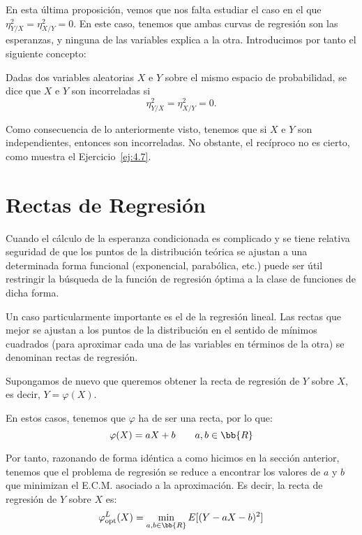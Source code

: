 En esta última proposición, vemos que nos falta estudiar el caso en el que $\eta_{Y/X}^2 = \eta_{X/Y}^2 = 0$. En este caso, tenemos que ambas curvas de regresión son las esperanzas, y ninguna de las variables explica a la otra. Introducimos por tanto el siguiente concepto:
\begin{definicion}[Incorrelación]
    Dadas dos variables aleatorias $X$ e $Y$ sobre el mismo espacio de probabilidad, se dice que $X$ e $Y$ son incorreladas si $$\eta_{Y/X}^2 = \eta_{X/Y}^2 = 0.$$
\end{definicion}

Como consecuencia de lo anteriormente visto, tenemos que si $X$ e $Y$ son independientes, entonces son incorreladas. No obstante, el recíproco no es cierto, como muestra el Ejercicio~\ref{ej:4.7}.


\section{Rectas de Regresión}

Cuando el cálculo de la esperanza condicionada es complicado y se tiene relativa seguridad de que los puntos de la distribución teórica se ajustan a una determinada forma funcional (exponencial, parabólica, etc.) puede ser útil restringir la búsqueda de la función de regresión óptima a la clase de funciones de dicha forma.

Un caso particularmente importante es el de la regresión lineal. Las rectas que mejor se ajustan a los puntos de la distribución en el sentido de mínimos cuadrados (para aproximar cada una de las variables en términos de la otra) se denominan rectas de regresión.

\begin{observacion}
    Supongamos de nuevo que queremos obtener la recta de regresión de $Y$ sobre $X$, es decir, $Y=\varphi(X)$.
\end{observacion}

En estos casos, tenemos que $\varphi$ ha de ser una recta, por lo que:
\begin{equation*}
    \varphi(X) = aX + b\qquad a,b\in\bb{R}
\end{equation*}

Por tanto, razonando de forma idéntica a como hicimos en la sección anterior, tenemos que el problema de regresión se reduce a encontrar los valores de $a$ y $b$ que minimizan el E.C.M. asociado a la aproximación. Es decir, la recta de regresión de $Y$ sobre $X$ es:
\begin{equation*}
    \varphi_{\text{opt}}^L(X) = \min_{a,b\in\bb{R}} E[(Y - aX - b)^2]
\end{equation*}

